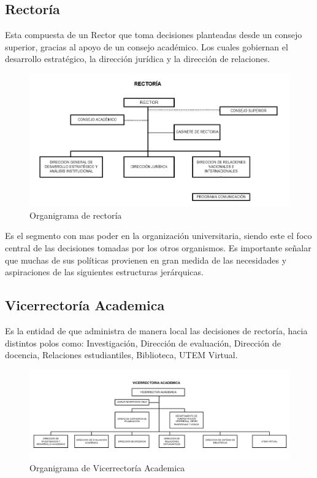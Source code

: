 \documentclass[a4paper,12pt,openany,oneside]{book}
\begin{document}
\subsection{Rectoría}
Esta compuesta de un Rector que toma decisiones planteadas desde un consejo superior, gracias al apoyo de un consejo académico. Los cuales gobiernan el desarrollo estratégico, la dirección jurídica y la dirección de relaciones.
\begin{figure}[!hbp]
\begin{center}
\includegraphics[scale=0.6,angle=0]{images/organigrama/1.png}
\caption{Organigrama de rector\'ia}
\label{Organigrama de rectoria}
\end{center}
\end{figure}

Es el segmento con mas poder en la organización universitaria, siendo este el foco central de las decisiones tomadas por los otros organismos. Es importante señalar que muchas de sus políticas provienen en gran medida de las necesidades y aspiraciones de las siguientes estructuras jerárquicas.

\subsection{Vicerrectoría Academica}
Es la entidad de que administra de manera local las decisiones de rectoría, hacia distintos polos como: Investigación, Dirección de evaluación, Dirección de docencia, Relaciones estudiantiles, Biblioteca, UTEM Virtual.
\begin{figure}[!hbp]
\begin{center}
\includegraphics[scale=0.45,angle=0]{images/organigrama/2.png}
\caption{Organigrama de Vicerrector\'ia Academica}
\label{Organigrama de vicerrectoria Academica}
\end{center}
\end{figure}
\end{document}
